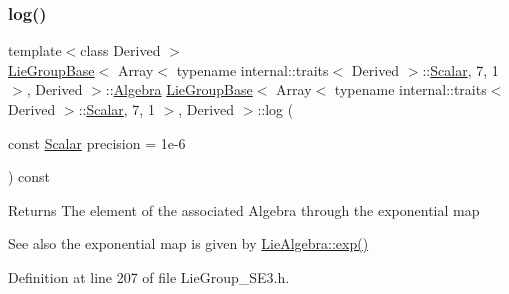 \subsubsection{\texorpdfstring{log()}{log()}}
{\footnotesize\ttfamily template$<$class Derived $>$ \\
\hyperlink{class_lie_group_base}{Lie\+Group\+Base}$<$ Array$<$ typename internal\+::traits$<$ Derived $>$\+::\hyperlink{class_lie_group_base_3_01_array_3_01typename_01internal_1_1traits_3_01_derived_01_4_1_1_scalar_0d6d4b5459662fc32c7117aee50362fb1_a831695c575380c9a1df32eff9fc4a8c6}{Scalar}, 7, 1 $>$, Derived $>$\+::\hyperlink{class_lie_group_base_3_01_array_3_01typename_01internal_1_1traits_3_01_derived_01_4_1_1_scalar_0d6d4b5459662fc32c7117aee50362fb1_a070c90abe2058ce2ab6a2f5ed271f6a0}{Algebra} \hyperlink{class_lie_group_base}{Lie\+Group\+Base}$<$ Array$<$ typename internal\+::traits$<$ Derived $>$\+::\hyperlink{class_lie_group_base_3_01_array_3_01typename_01internal_1_1traits_3_01_derived_01_4_1_1_scalar_0d6d4b5459662fc32c7117aee50362fb1_a831695c575380c9a1df32eff9fc4a8c6}{Scalar}, 7, 1 $>$, Derived $>$\+::log (\begin{DoxyParamCaption}\item[{const \hyperlink{class_lie_group_base_3_01_array_3_01typename_01internal_1_1traits_3_01_derived_01_4_1_1_scalar_0d6d4b5459662fc32c7117aee50362fb1_a831695c575380c9a1df32eff9fc4a8c6}{Scalar}}]{precision = {\ttfamily 1e-\/6} }\end{DoxyParamCaption}) const\hspace{0.3cm}{\ttfamily [inline]}}

\begin{DoxyReturn}{Returns}
The element of the associated Algebra through the exponential map 
\end{DoxyReturn}
\begin{DoxySeeAlso}{See also}
the exponential map is given by \hyperlink{class_lie_algebra_base_aafe7d43a29d43aed54dd91b3a3a4c9f7}{Lie\+Algebra\+::exp()} 
\end{DoxySeeAlso}


Definition at line 207 of file Lie\+Group\+\_\+\+S\+E3.\+h.

\hypertarget{class_lie_group_base_3_01_array_3_01typename_01internal_1_1traits_3_01_derived_01_4_1_1_scalar_0d6d4b5459662fc32c7117aee50362fb1_a25cfdbb6cf3577ed877d4d2f0c25bcd5}{}\label{class_lie_group_base_3_01_array_3_01typename_01internal_1_1traits_3_01_derived_01_4_1_1_scalar_0d6d4b5459662fc32c7117aee50362fb1_a25cfdbb6cf3577ed877d4d2f0c25bcd5} 
